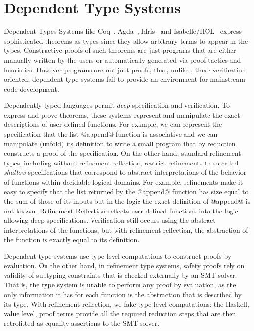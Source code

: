 \section{Dependent Type Systems}\label{related:dependenttypes}


Dependent Types Systems like Coq~\cite{coq-book}, 
Agda~\cite{agda}, Idris~\cite{Brady13} and Isabelle/HOL~\cite{isabelle}
express sophisticated theorems as types since they 
allow arbitrary terms to appear in the types.
%
Constructive proofs of such theorems are just programs
that are either manually written by the users or automatically generated via 
proof tactics and heuristics.
However programs are not just proofs, 
thus, unlike \toolname, these verification oriented, dependent type systems
fail to provide an environment for mainstream code development. 

Dependently typed languages permit
\textit{deep} specification and verification. 
%
To express and prove theorems, these systems
represent and manipulate the exact
descriptions of user-defined functions. 
%
For example, we can represent
the specification that the list @append@ function is associative and
we can manipulate (unfold) its definition 
to write a small program that by reduction
constructs a proof of the specification.
%
On the other hand, 
standard refinement types, including \toolname without refinement reflection,  
restrict refinements to so-called  \textit{shallow}
specifications that correspond to abstract interpretations of
the behavior of functions within decidable logical domains. 
%
For example, refinements make it easy
to specify that the list returned by the @append@ function has size
equal to the sum of those of its inputs
but in the logic the exact definition of @append@ is not known. 
%
Refinement Reflection reflects user defined functions into the logic
allowing deep specifications. 
Verification still occurs using the abstract interpretations of the functions, 
but with refinement reflection, the abstraction of the function is 
exactly equal to its definition. 

Dependent type systems use type level computations to construct proofs by evaluation. 
%
On the other hand, in refinement type systems, 
safety proofs rely on validity of subtyping constraints 
that is checked externally by an SMT solver. 
%
That is, the type system is unable to perform any proof by evaluation, 
as the only information it has for each function is the abstraction that is 
described by its type.
%
With refinement reflection, we fake type level computations: 
the Haskell, value level, proof terms provide all the required reduction steps
that are then retrofitted as equality assertions to the SMT solver.


